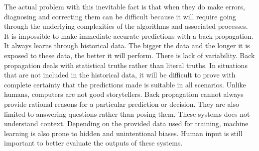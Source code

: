 {The actual problem with this inevitable fact is that when they do make errors, diagnosing and correcting them can be difficult because it will require going through the underlying complexities of the algorithms and associated processes. It is impossible to make immediate accurate predictions with a back propagation. It always learns through historical data. The bigger the data and the longer it is exposed to these data, the better it will perform. There is lack of variability. Back propagation deals with statistical truths rather than literal truths. In situations that are not included in the historical data, it will be difficult to prove with complete certainty that the predictions made is suitable in all scenarios. Unlike humans, computers are not good storytellers. Back propagation cannot always provide rational reasons for a particular prediction or decision. They are also limited to answering questions rather than posing them. These systems does not understand context. Depending on the provided data used for training, machine learning is also prone to hidden and unintentional biases. Human input is still important to better evaluate the outputs of these systems.

}
